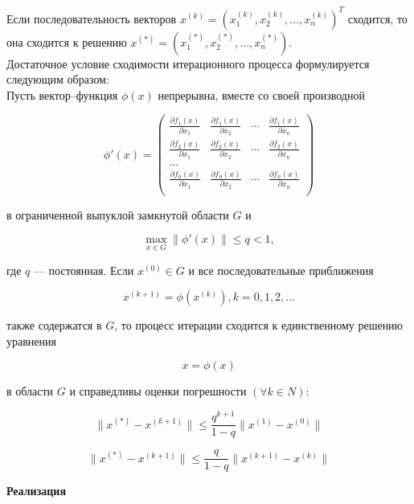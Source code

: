 Если последовательность векторов $x^{(k)}=(x_1^{(k)}, x_2^{(k)}, ..., x_n^{(k)})^T$ сходится, то она сходится к решению $x^{(*)}=(x_1^{(*)}, x_2^{(*)}, ..., x_n^{(*)})$.\\

Достаточное условие сходимости итерационного процесса формулируется следующим образом:\\

Пусть вектор--функция $\phi(x)$ непрерывна, вместе со своей производной

$$
\phi'(x)=\begin{pmatrix}
\frac{\partial f_1(x)}{\partial x_1} & \frac{\partial f_1(x)}{\partial x_2} & \cdots & \frac{\partial f_1(x)}{\partial x_n}\\
\frac{\partial f_2(x)}{\partial x_1} & \frac{\partial f_2(x)}{\partial x_2} & \cdots & \frac{\partial f_2(x)}{\partial x_n}\\
...\\
\frac{\partial f_n(x)}{\partial x_1} & \frac{\partial f_n(x)}{\partial x_2} & \cdots & \frac{\partial f_n(x)}{\partial x_n}\\
\end{pmatrix}
$$

в ограниченной выпуклой замкнутой области $G$ и

$$
\max\limits_{x \in G}\|\phi'(x)\| \leq q < 1,
$$

где $q$ --- постоянная. Если $x^{(0)} \in G$ и все последовательные приближения

$$
x^{(k+1)}=\phi(x^{(k)}), k=0,1,2,...
$$

также содержатся в $G$, то процесс итерации сходится к единственному решению уравнения

$$
x=\phi(x)
$$

в области $G$ и справедливы оценки погрешности $(\forall k \in N)$:

$$
\|x^{(*)}-x^{(k+1)}\| \leq \frac{q^{k+1}}{1-q}\|x^{(1)}-x^{(0)}\|
$$

$$
\|x^{(*)}-x^{(k+1)}\| \leq \frac{q}{1-q}\|x^{(k+1)}-x^{(k)}\|
$$

\textbf{Реализация}


